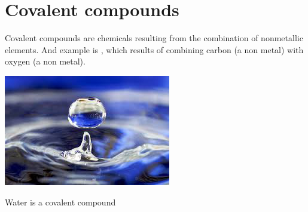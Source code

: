 \documentclass[main.tex]{subfiles}
\begin{document}
\section{Covalent compounds}
Covalent compounds are chemicals resulting from the combination of nonmetallic elements. And example is , which results of combining carbon (a non metal) with oxygen (a non metal).
\sloppy 
\begin{marginfigure}%
      \includegraphics{chapter5/figure3}
      \label{fig:marginfig}
      \caption{Water is a covalent compound}
	\end{marginfigure}%
\end{document}
